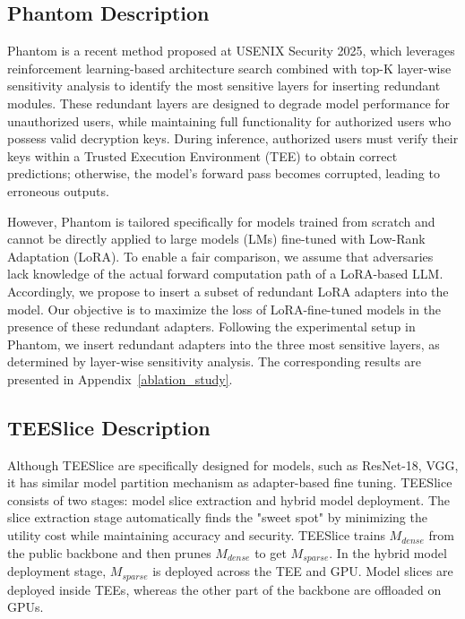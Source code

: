 \subsection{Phantom Description}
Phantom is a recent method proposed at USENIX Security 2025, which leverages reinforcement learning-based architecture search combined with top-K layer-wise sensitivity analysis to identify the most sensitive layers for inserting redundant modules. These redundant layers are designed to degrade model performance for unauthorized users, while maintaining full functionality for authorized users who possess valid decryption keys. During inference, authorized users must verify their keys within a Trusted Execution Environment (TEE) to obtain correct predictions; otherwise, the model's forward pass becomes corrupted, leading to erroneous outputs.

However, Phantom is tailored specifically for models trained from scratch and cannot be directly applied to large models (LMs) fine-tuned with Low-Rank Adaptation (LoRA). To enable a fair comparison, we assume that adversaries lack knowledge of the actual forward computation path of a LoRA-based LLM. Accordingly, we propose to insert a subset of redundant LoRA adapters into the model. Our objective is to maximize the loss of LoRA-fine-tuned models in the presence of these redundant adapters. Following the experimental setup in Phantom, we insert redundant adapters into the three most sensitive layers, as determined by layer-wise sensitivity analysis. The corresponding results are presented in Appendix~\ref{ablation_study}.

\subsection{TEESlice Description}
Although TEESlice are specifically designed for models, such as ResNet-18\cite{he2016deep_resnet}, VGG\cite{simonyan2014vgg}, it has similar model partition mechanism as adapter-based fine tuning. TEESlice consists of two stages: model slice extraction and hybrid model deployment. The slice extraction stage automatically finds the "sweet spot" by minimizing the utility cost while maintaining accuracy and security. TEESlice trains $M_{dense}$ from the public backbone and then prunes $M_{dense}$ to get $M_{sparse}$. In the hybrid model deployment stage, $M_{sparse}$ is deployed across the TEE and GPU. Model slices are deployed inside TEEs, whereas the other part of the backbone are offloaded on GPUs.

